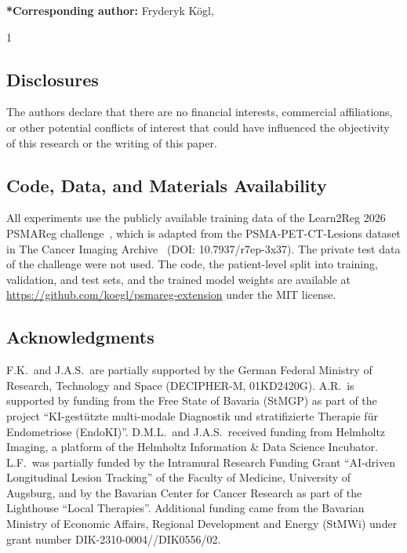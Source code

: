 \documentclass[12pt]{spieman}  %
\begin{document}

{\noindent \footnotesize\textbf{*Corresponding author:} Fryderyk K{\"o}gl, }

\begin{spacing}{1}







\subsection*{Disclosures}
The authors declare that there are no financial interests, commercial affiliations, or other potential conflicts of interest that could have influenced the objectivity of this research or the writing of this paper.

\subsection*{Code, Data, and Materials Availability}
All experiments use the publicly available training data of the Learn2Reg 2026 PSMAReg challenge~\cite{ref_learn2reg_alessa,ref_learn2reg_hansen}, which is adapted from the PSMA-PET-CT-Lesions dataset in The Cancer Imaging Archive~\cite{ref_psmaregdata} (DOI: 10.7937/r7ep-3x37).
The private test data of the challenge were not used.
The code, the patient-level split into training, validation, and test sets, and the trained model weights are available at \url{https://github.com/koegl/psmareg-extension} under the MIT license.

\subsection*{Acknowledgments}
F.K.\ and J.A.S.\ are partially supported by the German Federal Ministry of Research, Technology and Space (DECIPHER-M, 01KD2420G).
A.R.\ is supported by funding from the Free State of Bavaria (StMGP) as part of the project ``KI-gestützte multi-modale Diagnostik und stratifizierte Therapie für Endometriose (EndoKI)''.
D.M.L.\ and J.A.S.\ received funding from Helmholtz Imaging, a platform of the Helmholtz Information \& Data Science Incubator.
L.F.\ was partially funded by the Intramural Research Funding Grant ``AI-driven Longitudinal Lesion Tracking'' of the Faculty of Medicine, University of Augsburg, and by the Bavarian Center for Cancer Research as part of the Lighthouse ``Local Therapies''.
Additional funding came from the Bavarian Ministry of Economic Affairs, Regional Development and Energy (StMWi) under grant number DIK-2310-0004//DIK0556/02.


\end{spacing}
\end{document}
